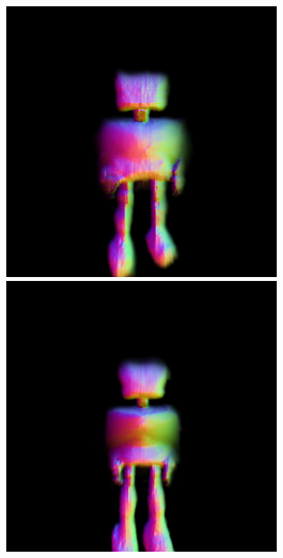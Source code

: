\begin{figure}[H]
\begin{subfigure}[b]{0.20\textwidth}
        \includegraphics[width=\textwidth]{etc/a robot made out of plants/dreamfusion/dreamfusion_plantrobot_5000_part2.png}
        \includegraphics[width=\textwidth]{etc/a robot made out of plants/dreamfusion/dreamfusion_plantrobot_10000_part2.png}

\end{subfigure}
\end{figure}
